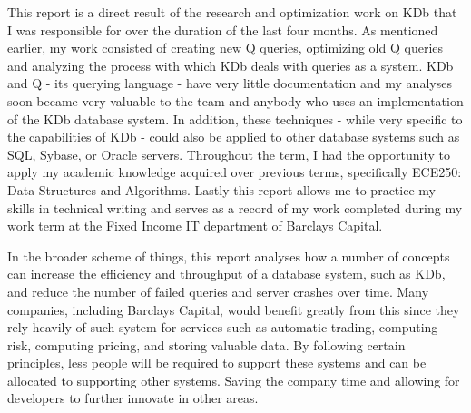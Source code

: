 This report is a direct result of the research and optimization work on KDb that I was responsible for over the duration of the last four months. As mentioned earlier, my work consisted of creating new Q queries, optimizing old Q queries and analyzing the process with which KDb deals with queries as a system.  KDb and Q - its querying language - have very little documentation and my analyses soon became very valuable to the team and anybody who uses an implementation of the KDb database system.  In addition, these techniques - while very specific to the capabilities of KDb - could also be applied to other database systems such as SQL, Sybase, or Oracle servers.  Throughout the term, I had the opportunity to apply my academic knowledge acquired over previous terms, specifically ECE250: Data Structures and Algorithms. Lastly this report allows me to practice my skills in technical writing and serves as a record of my work completed during my work term at the Fixed Income IT department of Barclays Capital.\newline


In the broader scheme of things, this report analyses how a number of concepts can increase the efficiency and throughput of a database system, such as KDb, and reduce the number of failed queries and server crashes over time.  Many companies, including Barclays Capital, would benefit greatly from this since they rely heavily of such system for services such as automatic trading, computing risk, computing pricing, and storing valuable data.  By following certain principles, less people will be required to support these systems and can be allocated to supporting other systems. Saving the company time and allowing for developers to further innovate in other areas.
